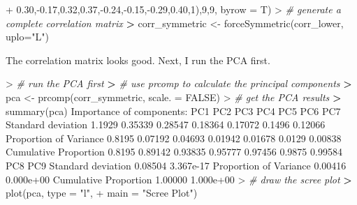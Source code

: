 \documentclass[
]{article}
\newenvironment{Shaded}{\begin{snugshade}}{\end{snugshade}}
\newcommand{\AttributeTok}[1]{\textcolor[rgb]{0.77,0.63,0.00}{#1}}
\newcommand{\CommentTok}[1]{\textcolor[rgb]{0.56,0.35,0.01}{\textit{#1}}}
\newcommand{\ConstantTok}[1]{\textcolor[rgb]{0.00,0.00,0.00}{#1}}
\newcommand{\DecValTok}[1]{\textcolor[rgb]{0.00,0.00,0.81}{#1}}
\newcommand{\ErrorTok}[1]{\textcolor[rgb]{0.64,0.00,0.00}{\textbf{#1}}}
\newcommand{\FloatTok}[1]{\textcolor[rgb]{0.00,0.00,0.81}{#1}}
\newcommand{\FunctionTok}[1]{\textcolor[rgb]{0.00,0.00,0.00}{#1}}
\newcommand{\NormalTok}[1]{#1}
\newcommand{\OtherTok}[1]{\textcolor[rgb]{0.56,0.35,0.01}{#1}}
\newcommand{\SpecialCharTok}[1]{\textcolor[rgb]{0.00,0.00,0.00}{#1}}
\newcommand{\StringTok}[1]{\textcolor[rgb]{0.31,0.60,0.02}{#1}}
\begin{document}
\begin{Shaded}
\begin{Highlighting}[]
\SpecialCharTok{+}                      \FloatTok{0.30}\NormalTok{,}\SpecialCharTok{{-}}\FloatTok{0.17}\NormalTok{,}\FloatTok{0.32}\NormalTok{,}\FloatTok{0.37}\NormalTok{,}\SpecialCharTok{{-}}\FloatTok{0.24}\NormalTok{,}\SpecialCharTok{{-}}\FloatTok{0.15}\NormalTok{,}\SpecialCharTok{{-}}\FloatTok{0.29}\NormalTok{,}\FloatTok{0.40}\NormalTok{,}\DecValTok{1}\NormalTok{),}\DecValTok{9}\NormalTok{,}\DecValTok{9}\NormalTok{, }\AttributeTok{byrow =}\NormalTok{ T)}
\SpecialCharTok{\textgreater{}} \CommentTok{\# generate a complete correlation matrix}
\ErrorTok{\textgreater{}}\NormalTok{ corr\_symmetric }\OtherTok{\textless{}{-}} \FunctionTok{forceSymmetric}\NormalTok{(corr\_lower, }\AttributeTok{uplo=}\StringTok{"L"}\NormalTok{)}
\end{Highlighting}
\end{Shaded}

The correlation matrix looks good. Next, I run the PCA first.

\begin{Shaded}
\begin{Highlighting}[]
\SpecialCharTok{\textgreater{}} \CommentTok{\# run the PCA first}
\ErrorTok{\textgreater{}} \CommentTok{\# use prcomp to calculate the principal components}
\ErrorTok{\textgreater{}}\NormalTok{ pca }\OtherTok{\textless{}{-}} \FunctionTok{prcomp}\NormalTok{(corr\_symmetric, }\AttributeTok{scale. =} \ConstantTok{FALSE}\NormalTok{)}
\SpecialCharTok{\textgreater{}} \CommentTok{\# get the PCA results}
\ErrorTok{\textgreater{}} \FunctionTok{summary}\NormalTok{(pca)}
\NormalTok{Importance of components}\SpecialCharTok{:}
\NormalTok{                          PC1     PC2     PC3     PC4     PC5    PC6     PC7}
\NormalTok{Standard deviation     }\FloatTok{1.1929} \FloatTok{0.35339} \FloatTok{0.28547} \FloatTok{0.18364} \FloatTok{0.17072} \FloatTok{0.1496} \FloatTok{0.12066}
\NormalTok{Proportion of Variance }\FloatTok{0.8195} \FloatTok{0.07192} \FloatTok{0.04693} \FloatTok{0.01942} \FloatTok{0.01678} \FloatTok{0.0129} \FloatTok{0.00838}
\NormalTok{Cumulative Proportion  }\FloatTok{0.8195} \FloatTok{0.89142} \FloatTok{0.93835} \FloatTok{0.95777} \FloatTok{0.97456} \FloatTok{0.9875} \FloatTok{0.99584}
\NormalTok{                           PC8       PC9}
\NormalTok{Standard deviation     }\FloatTok{0.08504} \FloatTok{3.367e{-}17}
\NormalTok{Proportion of Variance }\FloatTok{0.00416} \FloatTok{0.000e+00}
\NormalTok{Cumulative Proportion  }\FloatTok{1.00000} \FloatTok{1.000e+00}
\SpecialCharTok{\textgreater{}} \CommentTok{\# draw the scree plot }
\ErrorTok{\textgreater{}} \FunctionTok{plot}\NormalTok{(pca, }\AttributeTok{type =} \StringTok{"l"}\NormalTok{, }
\SpecialCharTok{+}      \AttributeTok{main =} \StringTok{"Scree Plot"}\NormalTok{)}
\end{Highlighting}
\end{Shaded}
\end{document}
